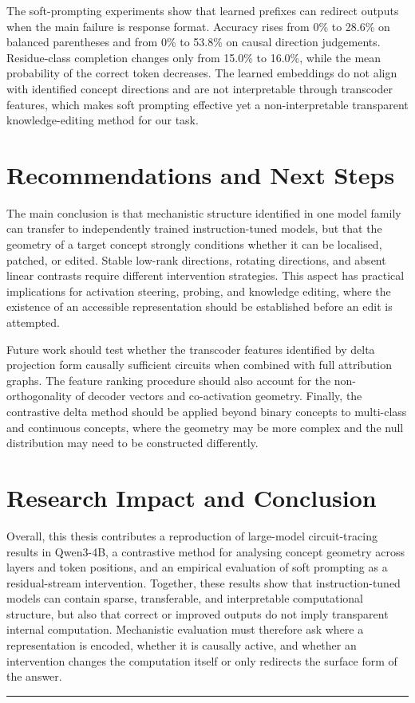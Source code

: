 \documentclass[11pt,a4paper]{article}
\begin{document}
The soft-prompting experiments show that learned prefixes can redirect outputs
when the main failure is response format. Accuracy rises from 0\% to 28.6\% on
balanced parentheses and from 0\% to 53.8\% on causal direction judgements.
Residue-class completion changes only from 15.0\% to 16.0\%, while the mean
probability of the correct token decreases. The learned embeddings do not align
with identified concept directions and are not interpretable through transcoder
features, which makes soft prompting effective yet a non-interpretable
transparent knowledge-editing method for our task.

\section{Recommendations and Next Steps}

The main conclusion is that mechanistic structure identified in one model family
can transfer to independently trained instruction-tuned models, but that the
geometry of a target concept strongly conditions whether it can be localised,
patched, or edited. Stable low-rank directions, rotating directions, and absent
linear contrasts require different intervention strategies. This aspect has practical
implications for activation steering, probing, and knowledge editing, where the
existence of an accessible representation should be established before an edit is
attempted.

Future work should test whether the transcoder features identified by delta
projection form causally sufficient circuits when combined with full attribution
graphs. The feature ranking procedure should also account for the
non-orthogonality of decoder vectors and co-activation geometry. Finally, the
contrastive delta method should be applied beyond binary concepts to multi-class and continuous concepts, 
where the geometry may be more complex and the null distribution may need to be
constructed differently.

\section{Research Impact and Conclusion}

Overall, this thesis contributes a reproduction of large-model circuit-tracing
results in Qwen3-4B, a contrastive method for analysing concept geometry across
layers and token positions, and an empirical evaluation of soft prompting as a
residual-stream intervention. Together, these results show that instruction-tuned
models can contain sparse, transferable, and interpretable computational
structure, but also that correct or improved outputs do not imply transparent
internal computation. Mechanistic evaluation must therefore ask where a
representation is encoded, whether it is causally active, and whether an
intervention changes the computation itself or only redirects the surface form of
the answer.

\vspace{8pt}
{\color{rulecol}\rule{\linewidth}{0.5pt}}

\begingroup
\small


\endgroup
\end{document}
